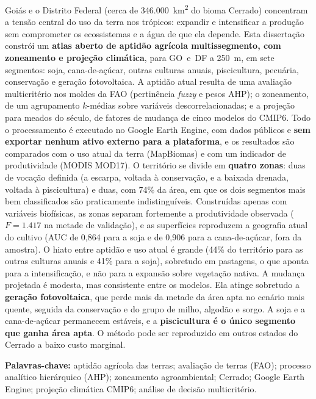 Goiás e o Distrito Federal (cerca de 346.000~km\textsuperscript{2} do bioma Cerrado)
concentram a tensão central do uso da terra nos trópicos: expandir e intensificar a produção sem
comprometer os ecossistemas e a água de que ela depende. Esta dissertação constrói um
\textbf{atlas aberto de aptidão agrícola multissegmento, com zoneamento e projeção climática}, para
GO~e~DF a 250~m, em sete segmentos: soja, cana-de-açúcar, outras culturas anuais, piscicultura,
pecuária, conservação e geração fotovoltaica. A aptidão atual resulta de uma avaliação multicritério
nos moldes da FAO (pertinência \emph{fuzzy} e pesos AHP); o zoneamento, de um agrupamento $k$-médias
sobre variáveis descorrelacionadas; e a projeção para meados do século, de fatores de mudança de cinco
modelos do CMIP6. Todo o processamento é executado no Google Earth Engine, com dados públicos e
\textbf{sem exportar nenhum ativo externo para a plataforma}, e os resultados são comparados com o uso
atual da terra (MapBiomas) e com um indicador de produtividade (MODIS MOD17). O território se divide em
\textbf{quatro zonas}: duas de vocação definida (a escarpa, voltada à conservação, e a baixada drenada,
voltada à piscicultura) e duas, com 74\% da área, em que os dois segmentos mais bem classificados são
praticamente indistinguíveis. Construídas apenas com variáveis biofísicas, as zonas separam fortemente
a produtividade observada ($F = 1.417$ na metade de validação), e as superfícies reproduzem a geografia
atual do cultivo (AUC de 0,864 para a soja e de 0,906 para a cana-de-açúcar, fora da amostra). O hiato
entre aptidão e uso atual é grande (44\% do território para as outras culturas anuais e 41\% para a
soja), sobretudo em pastagens, o que aponta para a intensificação, e não para a expansão sobre
vegetação nativa. A mudança projetada é modesta, mas consistente entre os modelos. Ela atinge sobretudo
a \textbf{geração fotovoltaica}, que perde mais da metade da área apta no cenário mais quente, seguida
da conservação e do grupo de milho, algodão e sorgo. A soja e a cana-de-açúcar permanecem estáveis, e a
\textbf{piscicultura é o único segmento que ganha área apta}. O método pode ser reproduzido em outros
estados do Cerrado a baixo custo marginal.

\vspace{0.4em}
\noindent\textbf{Palavras-chave:} aptidão agrícola das terras; avaliação de terras (FAO);
processo analítico hierárquico (AHP); zoneamento agroambiental; Cerrado; Google Earth Engine;
projeção climática CMIP6; análise de decisão multicritério.
